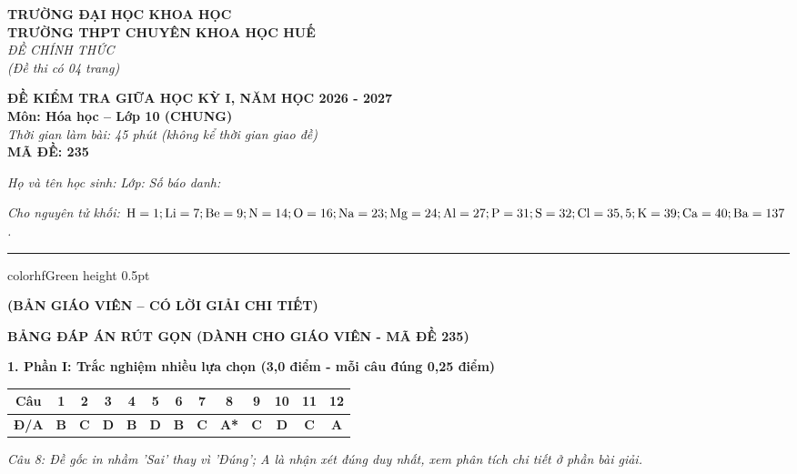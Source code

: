 \documentclass[11pt,a4paper]{article}
\begin{document}
\begin{minipage}[t]{0.48\textwidth}
\textbf{TRƯỜNG ĐẠI HỌC KHOA HỌC}\\
\textbf{TRƯỜNG THPT CHUYÊN KHOA HỌC HUẾ}\\
\textit{ĐỀ CHÍNH THỨC}\\
\textit{(Đề thi có 04 trang)}
\end{minipage}
\hfill
\begin{minipage}[t]{0.48\textwidth}
\raggedleft
\textbf{\color{hfRed}ĐỀ KIỂM TRA GIỮA HỌC KỲ I, NĂM HỌC 2026 - 2027}\\
\textbf{Môn: Hóa học -- Lớp 10 (CHUNG)}\\
\textit{Thời gian làm bài: 45 phút (không kể thời gian giao đề)}\\
\textbf{MÃ ĐỀ: 235}
\end{minipage}

\vspace{4pt}
\noindent
\textit{Họ và tên học sinh:} \dotfill \textit{Lớp:} \dotfill \textit{Số báo danh:} \dotfill

\vspace{3pt}
\noindent
\textit{\footnotesize Cho nguyên tử khối: $\ce{H}=1; \ce{Li}=7; \ce{Be}=9; \ce{N}=14; \ce{O}=16; \ce{Na}=23; \ce{Mg}=24; \ce{Al}=27; \ce{P}=31; \ce{S}=32; \ce{Cl}=35,5; \ce{K}=39; \ce{Ca}=40; \ce{Ba}=137$.}

\vspace{3pt}
\hrule color{hfGreen} height 0.5pt

\vspace{4pt}
\begin{center}
\textbf{\color{hfRed}\large (BẢN GIÁO VIÊN -- CÓ LỜI GIẢI CHI TIẾT)}
\end{center}

\vspace{2pt}
\begin{center}
{\color{hfRed}\textbf{\large BẢNG ĐÁP ÁN RÚT GỌN (DÀNH CHO GIÁO VIÊN - MÃ ĐỀ 235)}}
\end{center}

\vspace{2pt}
\noindent
\textbf{\color{mainGreen}1. Phần I: Trắc nghiệm nhiều lựa chọn (3,0 điểm - mỗi câu đúng 0,25 điểm)}
\begin{center}
\renewcommand{\arraystretch}{1.2}
\begin{tabular}{|c|c|c|c|c|c|c|c|c|c|c|c|c|}
\hline
\rowcolor{tableGreen}
\textbf{Câu} & \textbf{1} & \textbf{2} & \textbf{3} & \textbf{4} & \textbf{5} & \textbf{6} & \textbf{7} & \textbf{8} & \textbf{9} & \textbf{10} & \textbf{11} & \textbf{12} \\
\hline
\textbf{Đ/A} & \textbf{\color{hfRed}B} & \textbf{\color{hfRed}C} & \textbf{\color{hfRed}D} & \textbf{\color{hfRed}B} & \textbf{\color{hfRed}D} & \textbf{\color{hfRed}B} & \textbf{\color{hfRed}C} & \textbf{\color{hfRed}A*} & \textbf{\color{hfRed}C} & \textbf{\color{hfRed}D} & \textbf{\color{hfRed}C} & \textbf{\color{hfRed}A} \\
\hline
\end{tabular}
\end{center}
\textit{\footnotesize * Câu 8: Đề gốc in nhầm 'Sai' thay vì 'Đúng'; A là nhận xét đúng duy nhất, xem phân tích chi tiết ở phần bài giải.}
\end{document}
